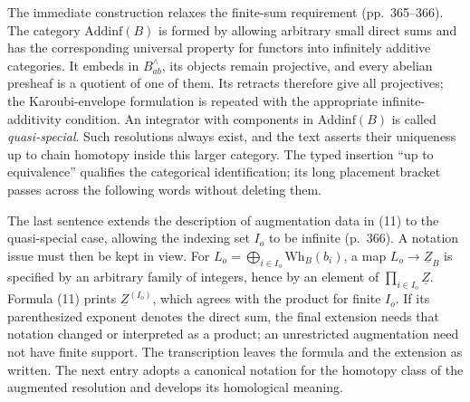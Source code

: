 The immediate construction relaxes the finite-sum requirement (pp.~365--366). The category $\mathrm{Addinf}(B)$ is formed by allowing arbitrary small direct sums and has the corresponding universal property for functors into infinitely additive categories. It embeds in $B^{\wedge}_{ab}$, its objects remain projective, and every abelian presheaf is a quotient of one of them. Its retracts therefore give all projectives; the Karoubi-envelope formulation is repeated with the appropriate infinite-additivity condition. An integrator with components in $\mathrm{Addinf}(B)$ is called \emph{quasi-special}. Such resolutions always exist, and the text asserts their uniqueness up to chain homotopy inside this larger category. The typed insertion ``up to equivalence'' qualifies the categorical identification; its long placement bracket passes across the following words without deleting them.

The last sentence extends the description of augmentation data in (11) to the quasi-special case, allowing the indexing set $I_o$ to be infinite (p.~366). A notation issue must then be kept in view. For $L_o=\bigoplus_{i\in I_o}\mathrm{Wh}_B(b_i)$, a map $L_o\to\underline Z_B$ is specified by an arbitrary family of integers, hence by an element of $\prod_{i\in I_o}\underline Z$. Formula (11) prints $\underline Z^{(I_o)}$, which agrees with the product for finite $I_o$. If its parenthesized exponent denotes the direct sum, the final extension needs that notation changed or interpreted as a product; an unrestricted augmentation need not have finite support. The transcription leaves the formula and the extension as written. The next entry adopts a canonical notation for the homotopy class of the augmented resolution and develops its homological meaning.


